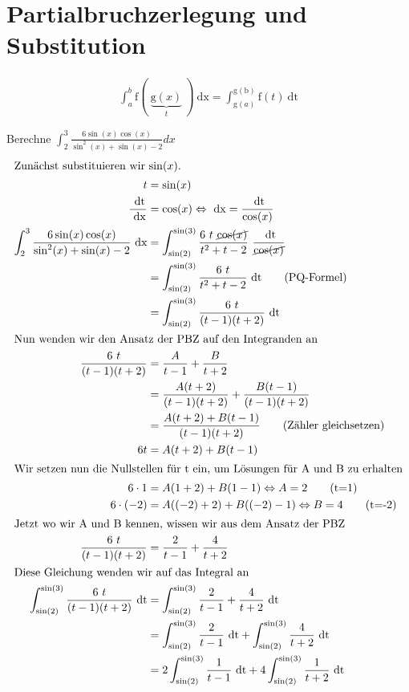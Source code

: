 \documentclass[11pt, a4paper]{article}
\providecommand{\dx}{\ \mathrm{dx}}
\providecommand{\dt}{\ \mathrm{dt}}
\begin{document}
\section{Partialbruchzerlegung und Substitution}
\begin{align}
	\int_a^b \mathrm{f}( \ \underbrace{\mathrm{g}(x)}_t \ ) \dx = \int_{\mathrm{g}(a)} ^{\mathrm{g(b)}} \mathrm{f}(t) \dt
\end{align}

Berechne $\int_2^3 \frac{6 \sin(x) \cos(x)}{\sin^2(x) + \sin(x) - 2 } dx$
\begin{align*}
	\intertext{Zunächst substituieren wir $\sin(x)$.}
	t &= \sin(x) \\
	\frac{\dt}{\dx} &= \cos(x) \Leftrightarrow \dx = \frac{\dt}{\cos(x)} \\
	\int_2^3 \frac{6 \sin(x) \cos(x)}{\sin^2(x) + \sin(x) - 2 } \dx &= \int_{\sin(2)}^{\sin(3)} \frac{6 \ t \ \cancel{\cos(x)}}{t^2 + t - 2} \ \frac{\dt}{\cancel{\cos(x)}} \\
	&= \int_{\sin(2)}^{\sin(3)} \frac{6 \ t}{t^2 + t - 2} \dt \tag{PQ-Formel} \\
	&= \int_{\sin(2)}^{\sin(3)} \frac{6 \ t}{(t-1)(t+2)} \dt \\
	\intertext{Nun wenden wir den Ansatz der PBZ auf den Integranden an}
	\frac{6 \ t}{(t-1)(t+2)} &= \frac{A}{t-1} + \frac{B}{t+2} \\
	&= \frac{A (t+2)}{(t-1)(t+2)} + \frac{B (t-1)}{(t-1)(t+2)} \\
	&= \frac{A (t+2) + B (t-1)}{(t-1)(t+2)} \tag{Zähler gleichsetzen} \\
	6t &= A (t+2) + B (t-1) \\
	\intertext{Wir setzen nun die Nullstellen für t ein, um Lösungen für A und B zu erhalten}
	6 \cdot 1 &= A (1+2) + B (1-1) \Leftrightarrow A = 2 \tag{t=1} \\
	6 \cdot (-2) &= A ((-2)+2) + B ((-2)-1) \Leftrightarrow B = 4 \tag{t=-2} \\
	\intertext{Jetzt wo wir A und B kennen, wissen wir aus dem Ansatz der PBZ}
	\frac{6 \ t}{(t-1)(t+2)} &= \frac{2}{t-1} + \frac{4}{t+2} \\
	\intertext{Diese Gleichung wenden wir auf das Integral an}
	 \int_{\sin(2)}^{\sin(3)} \frac{6 \ t}{(t-1)(t+2)} \dt &=  \int_{\sin(2)}^{\sin(3)} \frac{2}{t-1} + \frac{4}{t+2} \dt \\
	 &= \int_{\sin(2)}^{\sin(3)} \frac{2}{t-1} \dt + \int_{\sin(2)}^{\sin(3)} \frac{4}{t+2} \dt \\
	 &= 2 \int_{\sin(2)}^{\sin(3)} \frac{1}{t-1} \dt + 4 \int_{\sin(2)}^{\sin(3)} \frac{1}{t+2} \dt \\

\end{align*}
\end{document}
